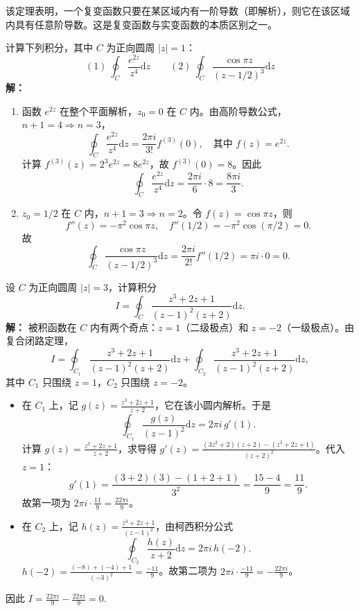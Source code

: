 该定理表明，一个复变函数只要在某区域内有一阶导数（即解析），则它在该区域内具有任意阶导数。这是复变函数与实变函数的本质区别之一。

\begin{tcolorbox}[title=例 5 (利用高阶导数公式), colframe=orange!75!black, colback=orange!5!white, sharp corners]
	计算下列积分，其中 $C$ 为正向圆周 $|z|=1$：
	\[
	(1)\ \oint_C \frac{e^{2z}}{z^4}\mathrm{d}z \qquad
	(2)\ \oint_C \frac{\cos \pi z}{(z-1/2)^3}\mathrm{d}z
	\]
	\tcbline
	\textbf{解：}
	\begin{enumerate}
		\item 函数 $e^{2z}$ 在整个平面解析，$z_0=0$ 在 $C$ 内。由高阶导数公式，$n+1=4 \Rightarrow n=3$，
		\[
		\oint_C \frac{e^{2z}}{z^4}\mathrm{d}z = \frac{2\pi i}{3!} f^{(3)}(0), \quad \text{其中 } f(z)=e^{2z}.
		\]
		计算 $f^{(3)}(z) = 2^3 e^{2z} = 8e^{2z}$，故 $f^{(3)}(0)=8$。因此
		\[
		\oint_C \frac{e^{2z}}{z^4}\mathrm{d}z = \frac{2\pi i}{6} \cdot 8 = \frac{8\pi i}{3}.
		\]
		\item $z_0=1/2$ 在 $C$ 内，$n+1=3 \Rightarrow n=2$。令 $f(z)=\cos \pi z$，则
		\[
		f''(z) = -\pi^2 \cos \pi z, \quad f''(1/2) = -\pi^2 \cos(\pi/2) = 0.
		\]
		故
		\[
		\oint_C \frac{\cos \pi z}{(z-1/2)^3}\mathrm{d}z = \frac{2\pi i}{2!} f''(1/2) = \pi i \cdot 0 = 0.
		\]
	\end{enumerate}
\end{tcolorbox}

\begin{tcolorbox}[title=例 6 (柯西积分与高阶导数的综合), colframe=orange!75!black, colback=orange!5!white, sharp corners]
	设 $C$ 为正向圆周 $|z|=3$，计算积分
	\[
	I = \oint_C \frac{z^3 + 2z + 1}{(z-1)^2(z+2)}\mathrm{d}z.
	\]
	\tcbline
	\textbf{解：} 被积函数在 $C$ 内有两个奇点：$z=1$（二级极点）和 $z=-2$（一级极点）。由复合闭路定理，
	\[
	I = \oint_{C_1} \frac{z^3+2z+1}{(z-1)^2(z+2)}\mathrm{d}z + \oint_{C_2} \frac{z^3+2z+1}{(z-1)^2(z+2)}\mathrm{d}z,
	\]
	其中 $C_1$ 只围绕 $z=1$，$C_2$ 只围绕 $z=-2$。
	\begin{itemize}
		\item 在 $C_1$ 上，记 $g(z) = \frac{z^3+2z+1}{z+2}$，它在该小圆内解析。于是
		\[
		\oint_{C_1} \frac{g(z)}{(z-1)^2}\mathrm{d}z = 2\pi i \, g'(1).
		\]
		计算 $g(z) = \frac{z^3+2z+1}{z+2}$，求导得 $g'(z) = \frac{(3z^2+2)(z+2) - (z^3+2z+1)}{(z+2)^2}$。代入 $z=1$：
		\[
		g'(1) = \frac{(3+2)(3) - (1+2+1)}{3^2} = \frac{15 - 4}{9} = \frac{11}{9}.
		\]
		故第一项为 $2\pi i \cdot \frac{11}{9} = \frac{22\pi i}{9}$。
		\item 在 $C_2$ 上，记 $h(z) = \frac{z^3+2z+1}{(z-1)^2}$，由柯西积分公式
		\[
		\oint_{C_2} \frac{h(z)}{z+2}\mathrm{d}z = 2\pi i \, h(-2).
		\]
		$h(-2) = \frac{(-8) + (-4) + 1}{(-3)^2} = \frac{-11}{9}$。故第二项为 $2\pi i \cdot \frac{-11}{9} = -\frac{22\pi i}{9}$。
	\end{itemize}
	因此 $I = \frac{22\pi i}{9} - \frac{22\pi i}{9} = 0$.
\end{tcolorbox}

